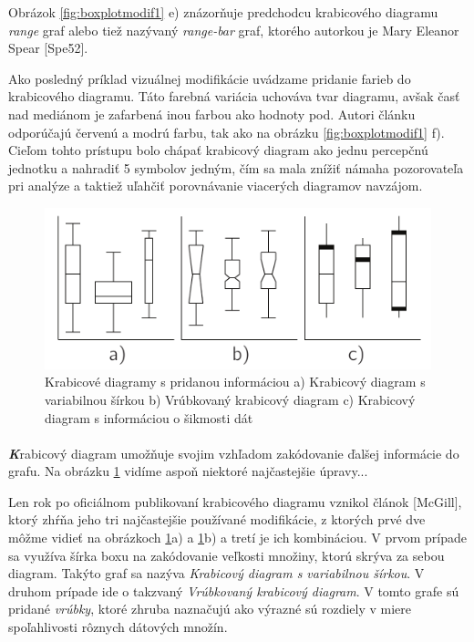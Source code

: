 Obrázok \ref{fig:boxplotmodif1} e) znázorňuje predchodcu krabicového diagramu \textit{range} graf alebo tiež nazývaný \textit{range-bar} graf, ktorého autorkou je Mary Eleanor Spear [Spe52].

Ako posledný príklad vizuálnej modifikácie uvádzame pridanie farieb do krabicového diagramu. Táto farebná variácia uchováva tvar diagramu, avšak časť nad mediánom je zafarbená inou farbou ako hodnoty pod. Autori článku odporúčajú červenú a modrú farbu, tak ako na obrázku \ref{fig:boxplotmodif1} f). Cieľom tohto prístupu bolo chápať krabicový diagram ako jednu percepčnú jednotku a nahradiť 5 symbolov jedným, čím sa mala znížiť námaha pozorovateľa pri analýze a taktiež uľahčiť porovnávanie viacerých diagramov navzájom. 


\begin{figure}
	\centering
	\includegraphics[width = 6in]{boxplot3}
	\caption{Krabicové diagramy s pridanou informáciou a) Krabicový diagram s variabilnou šírkou b) Vrúbkovaný krabicový diagram c) Krabicový diagram s informáciou o šikmosti dát}
	\label{fig:boxplotmodif2}
\end{figure}


\paragraph{}
{\large \textbf{\textit{K}}}rabicový diagram umožňuje svojim vzhľadom zakódovanie ďalšej informácie do grafu. Na obrázku \ref{fig:boxplotmodif2} vidíme aspoň niektoré najčastejšie úpravy... 

Len rok po oficiálnom publikovaní krabicového diagramu vznikol článok [McGill], ktorý zhŕňa jeho tri najčastejšie používané modifikácie, z ktorých prvé dve môžme vidieť na obrázkoch \ref{fig:boxplotmodif2}a) a \ref{fig:boxplotmodif2}b) a tretí je ich kombináciou. V prvom prípade sa využíva šírka boxu na zakódovanie veľkosti množiny, ktorú skrýva za sebou diagram. Takýto graf sa nazýva \textit{Krabicový diagram s variabilnou šírkou}.  
V druhom prípade ide o takzvaný \textit{Vrúbkovaný krabicový diagram}. V tomto grafe sú pridané \textit{vrúbky}, ktoré zhruba naznačujú ako výrazné sú rozdiely v miere spoľahlivosti rôznych dátových množín. 

